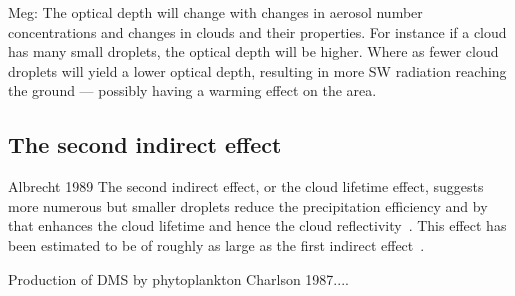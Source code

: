 Meg: The optical depth will change with changes in aerosol number concentrations and changes in clouds and their properties. For instance if a cloud has many small droplets, the optical depth will be higher. Where as  fewer cloud droplets will yield a lower optical depth, resulting in more SW radiation reaching the ground — possibly having a warming effect on the area. 


\subsection{The second indirect effect}
Albrecht 1989 
The second indirect effect, or the cloud lifetime effect, suggests more numerous but smaller droplets reduce the precipitation efficiency and by that enhances the cloud lifetime and hence the cloud reflectivity~\citep{Albrecht1989}. This effect has been estimated to be of roughly as large as the first indirect effect~\citep{Lohmann2005}.


Production of DMS by phytoplankton Charlson 1987....



